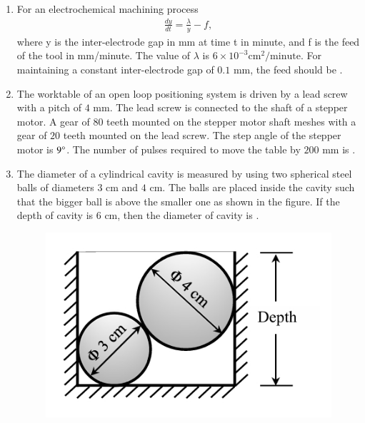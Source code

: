 \documentclass[journal,12pt,onecolumn]{IEEEtran}
\theoremstyle{remark}
\begin{document}
\begin{enumerate}
    \hfill{}

    \item For an electrochemical machining process
    \begin{align*}
        \frac{dy}{dt}=\frac{\lambda}{y}-f,
    \end{align*}
    where y is the inter-electrode gap in mm at time t in minute, and f is the feed of the tool in mm/minute. The value of $\lambda$ is $6\times10^{-3} \text{cm}^{2}/\text{minute}$. For maintaining a constant inter-electrode gap of $0.1$ mm, the feed  should be \underline{\hspace{2cm}}.

    \hfill{}

    \item The worktable of an open loop positioning system is driven by a lead screw with a pitch of $4$ mm. The lead screw is connected to the shaft of a stepper motor. A gear of $80$ teeth mounted on the stepper motor shaft meshes with a gear of $20$ teeth mounted on the lead screw. The step angle of the stepper motor is $9\degree$. The number of pulses required to move the table by $200$ mm is \underline{\hspace{2cm}}.

    \hfill{}

    \item The diameter of a cylindrical cavity is measured by using two spherical steel balls of diameters $3$ cm and $4$ cm. The balls are placed inside the cavity such that the bigger ball is above the smaller one as shown in the figure. If the depth of cavity is $6$ cm, then the diameter  of cavity is \underline{\hspace{2cm}}.
    \begin{figure}[h]
        \centering
        \includegraphics[width=0.4\columnwidth]{q56.png}
        \caption*{}
        \label{fig:q56}
    \end{figure}

    \hfill{}


\end{enumerate}
\end{document}
